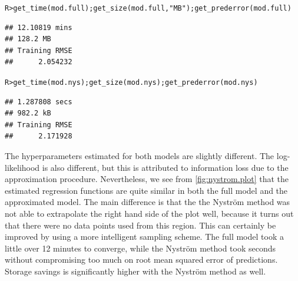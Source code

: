 \documentclass[showframe,11pt]{report}\usepackage[]{graphicx}\usepackage[]{color}
\makeatletter
\newcommand{\hlstr}[1]{\textcolor[rgb]{0.063,0.58,0.627}{#1}}%
\newcommand{\hlstd}[1]{\textcolor[rgb]{0.196,0.196,0.196}{#1}}%
\newcommand{\hlkwd}[1]{\textcolor[rgb]{0.78,0.227,0.412}{#1}}%
\newenvironment{kframe}{%
 \def\at@end@of@kframe{}%
 \ifinner\ifhmode%
  \def\at@end@of@kframe{\end{minipage}}%
  \begin{minipage}{\columnwidth}%
 \fi\fi%
 \def\FrameCommand##1{\hskip\@totalleftmargin \hskip-\fboxsep
 \colorbox{shadecolor}{##1}\hskip-\fboxsep
     \hskip-\linewidth \hskip-\@totalleftmargin \hskip\columnwidth}%
 \MakeFramed {\advance\hsize-\width
   \@totalleftmargin\z@ \linewidth\hsize
   \@setminipage}}%
 {\par\unskip\endMakeFramed%
 \at@end@of@kframe}
\newenvironment{knitrout}{}{} %
\makeatother
\begin{document}
\begin{knitrout}
\color{fgcolor}\begin{kframe}
\begin{alltt}
\hlstd{R> }\hlkwd{get_time}\hlstd{(mod.full);} \hlkwd{get_size}\hlstd{(mod.full,} \hlstr{"MB"}\hlstd{);} \hlkwd{get_prederror}\hlstd{(mod.full)}
\end{alltt}
\begin{verbatim}
## 12.10819 mins
## 128.2 MB
## Training RMSE 
##      2.054232
\end{verbatim}
\begin{alltt}
\hlstd{R> }\hlkwd{get_time}\hlstd{(mod.nys);} \hlkwd{get_size}\hlstd{(mod.nys);} \hlkwd{get_prederror}\hlstd{(mod.nys)}
\end{alltt}
\begin{verbatim}
## 1.287808 secs
## 982.2 kB
## Training RMSE 
##      2.171928
\end{verbatim}
\end{kframe}
\end{knitrout}

The hyperparameters estimated for both models are slightly different.
The log-likelihood is also different, but this is attributed to information loss due to the approximation procedure.
Nevertheless, we see from \cref{fig:nystrom.plot} that the estimated regression functions are quite similar in both the full model and the approximated model.
The main difference is that the the Nystr\"om method was not able to extrapolate the right hand side of the plot well, because it turns out that there were no data points used from this region.
This can certainly be improved by using a more intelligent sampling scheme.
The full model took a little over 12 minutes to converge, while the Nystr\"om method took seconds without compromising too much on root mean squared error of predictions.
Storage savings is significantly higher with the Nystr\"om method as well.
\end{document}
